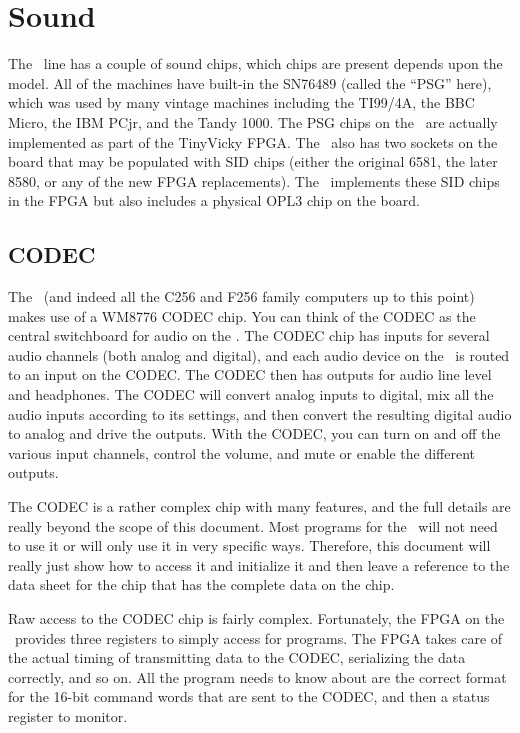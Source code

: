 \chapter{Sound}

The \jr\ line has a couple of sound chips, which chips are present depends upon the model. All of the machines have built-in the SN76489 (called the ``PSG'' here), which was used by many vintage machines including the TI99/4A, the BBC Micro, the IBM PCjr, and the Tandy 1000. The PSG chips on the \jr\ are actually implemented as part of the TinyVicky FPGA. The \fjr\ also has two sockets on the board that may be populated with SID chips (either the original 6581, the later 8580, or any of the new FPGA replacements). The \fk\ implements these SID chips in the FPGA but also includes a physical OPL3 chip on the board.

\section*{CODEC}

The \jr\ (and indeed all the C256 and F256 family computers up to this point) makes use of a WM8776 CODEC chip. You can think of the CODEC as the central switchboard for audio on the \jr. The CODEC chip has inputs for several audio channels (both analog and digital), and each audio device on the \jr\ is routed to an input on the CODEC. The CODEC then has outputs for audio line level and headphones. The CODEC will convert analog inputs to digital, mix all the audio inputs according to its settings, and then convert the resulting digital audio to analog and drive the outputs. With the CODEC, you can turn on and off the various input channels, control the volume, and mute or enable the different outputs.

The CODEC is a rather complex chip with many features, and the full details are really beyond the scope of this document. Most programs for the \jr\ will not need to use it or will only use it in very specific ways. Therefore, this document will really just show how to access it and initialize it and then leave a reference to the data sheet for the chip that has the complete data on the chip.

Raw access to the CODEC chip is fairly complex. Fortunately, the FPGA on the \jr\ provides three registers to simply access for programs. The FPGA takes care of the actual timing of transmitting data to the CODEC, serializing the data correctly, and so on. All the program needs to know about are the correct format for the 16-bit command words that are sent to the CODEC, and then a status register to monitor.

